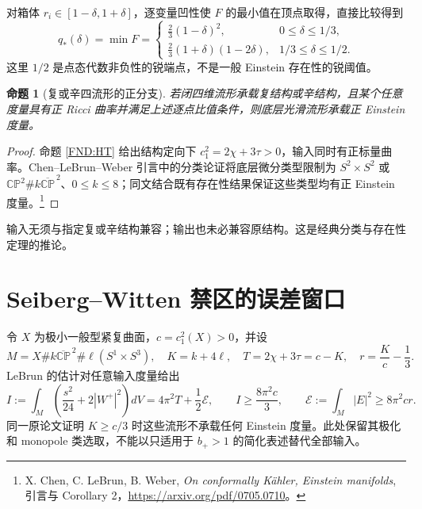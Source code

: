 \documentclass[UTF8,fontset=fandol,zihao=-4,oneside,openany]{ctexbook}
\theoremstyle{cjkplain}
\newtheorem{proposition}[theorem]{命题}
\numberwithin{equation}{chapter}
\begin{document}
对箱体 \(r_i\in[1-\delta,1+\delta]\)，逐变量凹性使 \(F\) 的最小值在顶点取得，直接比较得到
\begin{equation}\label{FND:qstar}
q_*(\delta)=\min F=
\begin{cases}
\frac23(1-\delta)^2,&0\le\delta\le1/3,\\
\frac23(1+\delta)(1-2\delta),&1/3\le\delta\le1/2.
\end{cases}
\end{equation}
这里 \(1/2\) 是点态代数非负性的锐端点，不是一般 Einstein 存在性的锐阈值。

\begin{proposition}[复或辛四流形的正分支]\label{FND:positive}
若闭四维流形承载复结构或辛结构，且某个任意度量具有正 Ricci 曲率并满足上述逐点比值条件，则底层光滑流形承载正 Einstein 度量。
\end{proposition}
\begin{proof}
命题 \ref{FND:HT} 给出结构定向下 \(c_1^2=2\chi+3\tau>0\)，输入同时有正标量曲率。Chen--LeBrun--Weber 引言中的分类论证将底层微分类型限制为
\(S^2\times S^2\) 或
\(\mathbb{CP}^2\#k\overline{\mathbb{CP}}^{\,2}\)、\(0\le k\le8\)；同文结合既有存在性结果保证这些类型均有正 Einstein 度量。\footnote{X. Chen, C. LeBrun, B. Weber, \emph{On conformally Kähler, Einstein manifolds}, 引言与 Corollary 2，\url{https://arxiv.org/pdf/0705.0710}。}
\end{proof}
输入无须与指定复或辛结构兼容；输出也未必兼容原结构。这是经典分类与存在性定理的推论。

\section{Seiberg--Witten 禁区的误差窗口}
令 \(X\) 为极小一般型紧复曲面，\(c=c_1^2(X)>0\)，并设
\[
M=X\#k\overline{\mathbb{CP}}^{\,2}\#\ell(S^1\times S^3),
\quad K=k+4\ell,\quad
T=2\chi+3\tau=c-K,\quad r=\frac Kc-\frac13.
\]
LeBrun 的估计对任意输入度量给出
\[
I:=\int_M\left(\frac{s^2}{24}+2|W^+|^2\right)dV
=4\pi^2T+\frac12\mathcal E,\qquad
I\ge\frac{8\pi^2c}{3},\qquad
\mathcal E:=\int_M|E|^2\ge8\pi^2cr .
\]
同一原论文证明 \(K\ge c/3\) 时这些流形不承载任何 Einstein 度量。此处保留其极化和 monopole 类选取，不能以只适用于 \(b_+>1\) 的简化表述替代全部输入。
\end{document}
